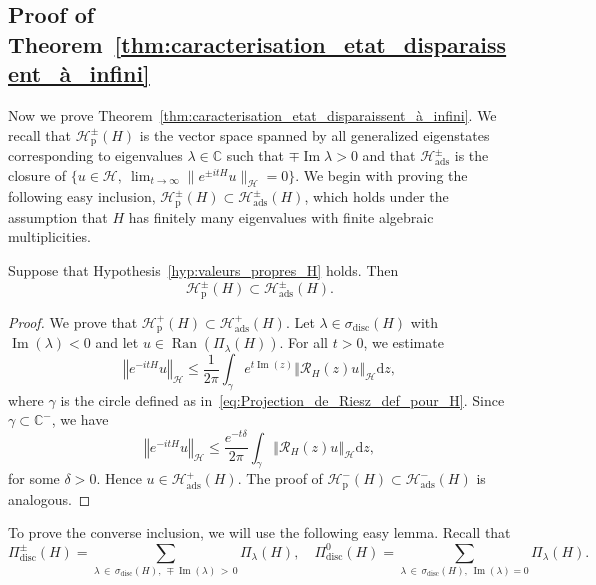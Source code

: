 \documentclass[10pt]{amsart}
\theoremstyle{definition}\newtheorem{defi}[theo]{Definition}\newtheorem{rema}[theo]{Remark}\newtheorem{exam}[theo]{Example}\newtheorem{exem}[theo]{Example}\newtheorem{nota}[theo]{Notation}
\newcommand{\Hi}{\mathcal{H}}
\newcommand{\bbC}{\mathbb{C}}
\newcommand{\rmp}{\mathrm{p}}
\newcommand{\ads}{\mathrm{ads}}
\newcommand{\rmd}{\mathrm{d}}
\newcommand{\disc}{\mathrm{disc}}
\newcommand{\norme}[1]{\left\Vert #1\right\Vert}
\newcommand{\Res}{\mathcal{R}}
\DeclareMathOperator{\Ran}{Ran}
\DeclareMathOperator{\im}{Im}
\begin{document}
\subsection{Proof of Theorem~\ref{thm:caracterisation_etat_disparaissent_à_infini}}\label{subsec:ads}

Now we prove Theorem~\ref{thm:caracterisation_etat_disparaissent_à_infini}. We recall that $\Hi_\rmp^\pm(H)$ is the vector space spanned by all generalized eigenstates corresponding to eigenvalues $\lambda\in\bbC$ such that $\mp\im\lambda >0$ and that $\Hi_\ads^\pm$ is the closure of $\{ u\in\Hi,~\lim_{t\rightarrow \infty}\|e^{\pm itH}u\|_\Hi=0\}$. We begin with proving the following easy inclusion, $\Hi_\rmp^\pm(H)\subset\Hi_\ads^\pm(H)$, which holds under the assumption that $H$ has finitely many eigenvalues with finite algebraic multiplicities.


\begin{prop}\label{prop:easy_incl}
Suppose that Hypothesis~\ref{hyp:valeurs_propres_H} holds. Then
\begin{equation*}
\Hi_\rmp^\pm(H)\subset\Hi_\ads^\pm(H).
\end{equation*}
\end{prop}

\begin{proof}
We prove that $\Hi_\rmp^+(H)\subset\Hi_{\ads}^+(H)$. Let $\lambda\in\sigma_{\disc}(H)$ with $\im(\lambda)<0$ and let $u\in\Ran(\Pi_\lambda(H))$. For all $t>0$, we estimate
\begin{equation*}
\norme{e^{-itH}u}_\Hi\leq\frac{1}{2\pi}\int_\gamma e^{t\im(z)}\norme{\Res_H(z)u}_\Hi \rmd z,
\end{equation*}
where $\gamma$ is the circle defined as in~\eqref{eq:Projection_de_Riesz_def_pour_H}. Since $\gamma\subset\bbC^-$, we have
\begin{equation*}
\norme{e^{-itH}u}_\Hi\leq\frac{e^{-t\delta}}{2\pi} \int_\gamma \norme{\Res_H(z)u}_\Hi \rmd z,
\end{equation*}
for some $\delta>0$. Hence $u\in\Hi_{\ads}^+(H)$. The proof of $\Hi_\rmp^-(H)\subset\Hi_{\ads}^-(H)$ is analogous.
\end{proof}

To prove the converse inclusion, we will use the following easy lemma. Recall that
\begin{equation*}
\Pi^\pm_{\disc}(H)=\sum_{\lambda\,\in\,\sigma_{\disc}(H),\,\mp\im(\lambda)\,>\,0}\Pi_\lambda(H), \quad \Pi^0_{\disc}(H)=\sum_{\lambda\,\in\,\sigma_{\disc}(H),\,\im(\lambda)=0}\Pi_\lambda(H).
\end{equation*}
\end{document}
